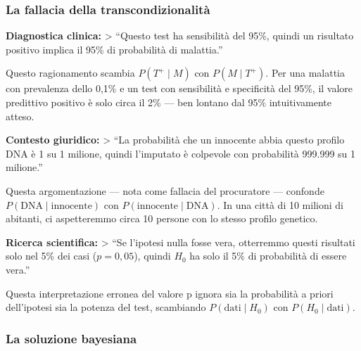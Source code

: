 \documentclass[
  letterpaper,
  DIV=11,
  numbers=noendperiod,
  oneside]{scrreprt}
\theoremstyle{definition}
\theoremstyle{plain}
\theoremstyle{definition}
\theoremstyle{remark}
\begin{document}
\begin{tcolorbox}[enhanced jigsaw, arc=.35mm, breakable, colbacktitle=quarto-callout-warning-color!10!white, opacityback=0, toprule=.15mm, rightrule=.15mm, colback=white, opacitybacktitle=0.6, leftrule=.75mm, coltitle=black, bottomtitle=1mm, left=2mm, toptitle=1mm, title=\textcolor{quarto-callout-warning-color}{\faExclamationTriangle}\hspace{0.5em}{Errori inferenziali sistematici}, titlerule=0mm, bottomrule=.15mm, colframe=quarto-callout-warning-color-frame]

\subsubsection*{La fallacia della
transcondizionalità}\label{la-fallacia-della-transcondizionalituxe0}

\textbf{Diagnostica clinica:} \textgreater{} ``Questo test ha
sensibilità del 95\%, quindi un risultato positivo implica il 95\% di
probabilità di malattia.''

Questo ragionamento scambia \(P(T^+ \mid M)\) con \(P(M \mid T^+)\). Per
una malattia con prevalenza dello 0,1\% e un test con sensibilità e
specificità del 95\%, il valore predittivo positivo è solo circa il 2\%
--- ben lontano dal 95\% intuitivamente atteso.

\textbf{Contesto giuridico:} \textgreater{} ``La probabilità che un
innocente abbia questo profilo DNA è 1 su 1 milione, quindi l'imputato è
colpevole con probabilità 999.999 su 1 milione.''

Questa argomentazione --- nota come fallacia del procuratore ---
confonde \(P(\text{DNA} \mid \text{innocente})\) con
\(P(\text{innocente} \mid \text{DNA})\). In una città di 10 milioni di
abitanti, ci aspetteremmo circa 10 persone con lo stesso profilo
genetico.

\textbf{Ricerca scientifica:} \textgreater{} ``Se l'ipotesi nulla fosse
vera, otterremmo questi risultati solo nel 5\% dei casi (\(p = 0,05\)),
quindi \(H_0\) ha solo il 5\% di probabilità di essere vera.''

Questa interpretazione erronea del valore p ignora sia la probabilità a
priori dell'ipotesi sia la potenza del test, scambiando
\(P(\text{dati} \mid H_0)\) con \(P(H_0 \mid \text{dati})\).

\end{tcolorbox}

\subsubsection{La soluzione bayesiana}\label{la-soluzione-bayesiana}
\end{document}
